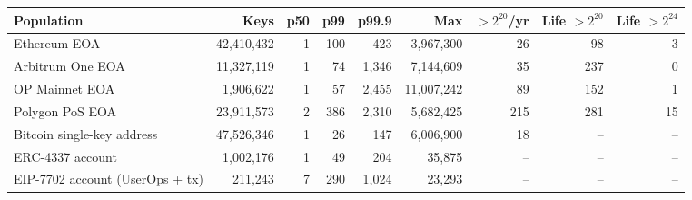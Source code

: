 \begin{tabular}{lrrrrrrrr}
\hline
Population & Keys & p50 & p99 & p99.9 & Max & $>2^{20}$/yr & Life $>2^{20}$ & Life $>2^{24}$\\
\hline
Ethereum EOA & 42,410,432 & 1 & 100 & 423 & 3,967,300 & 26 & 98 & 3\\
Arbitrum One EOA & 11,327,119 & 1 & 74 & 1,346 & 7,144,609 & 35 & 237 & 0\\
OP Mainnet EOA & 1,906,622 & 1 & 57 & 2,455 & 11,007,242 & 89 & 152 & 1\\
Polygon PoS EOA & 23,911,573 & 2 & 386 & 2,310 & 5,682,425 & 215 & 281 & 15\\
Bitcoin single-key address & 47,526,346 & 1 & 26 & 147 & 6,006,900 & 18 & -- & --\\
ERC-4337 account & 1,002,176 & 1 & 49 & 204 & 35,875 & -- & -- & --\\
EIP-7702 account (UserOps + tx) & 211,243 & 7 & 290 & 1,024 & 23,293 & -- & -- & --\\
\hline
\end{tabular}
